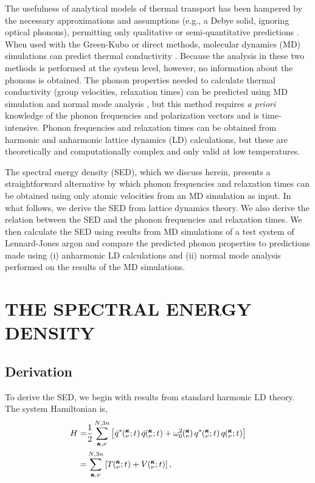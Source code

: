 \documentclass[twocolumn,10pt]{asme2e}
\newcommand{\SUM}[2]{\ifthenelse{\equal{#1}{0}}{\sum_{\alpha_{#2},b_{#2},l_{#2}}^{3,n,N}} {\ifthenelse{\equal{#1}{1}}{\sum_{\alpha_{#2},b_{#2}}^{3,n}}{\sum_{\pmb{\kappa}#2,\nu#2}^{N,3n}}}}
\newcommand{\kvt}{\mspace{-4.0mu}\left(\mspace{-8.0mu}\begin{smallmatrix}&\pmb{\kappa} \\&\nu\end{smallmatrix}\mspace{-2.0mu};t\right)}
\newcommand{\kv}{\mspace{-4.0mu}\left(\mspace{-8.0mu}\begin{smallmatrix}&\pmb{\kappa} \\&\nu\end{smallmatrix}\mspace{-3.0mu}\right)}
\begin{document}
The usefulness of analytical models of thermal transport has been hampered by
the necessary approximations and assumptions (e.g., a Debye solid, ignoring
optical phonons), permitting only qualitative or semi-quantitative
predictions \cite{callaway1959,holland1963}. When used with the Green-Kubo or
direct methods, molecular dynamics (MD) simulations can predict thermal
conductivity \cite{mcgaughey2004c,landry2008,schelling2002,sellan2010a}.
Because the analysis in these two methods is performed at the system level,
however, no information about the phonons is obtained. The phonon properties
needed to calculate thermal conductivity (group velocities, relaxation times)
can be predicted using MD simulation and normal mode analysis
\cite{ladd1986,mcgaughey2004c,henry2008,goicochea2010}, but this method
requires {\em a priori} knowledge of the phonon frequencies and polarization
vectors and is time-intensive. Phonon frequencies and relaxation times can be
obtained from harmonic and anharmonic lattice dynamics (LD)
calculations,\cite{maradudin1962,wallace1972,ladd1986,dove1993,turney2009a}
but these are theoretically and computationally complex and only valid at low
temperatures.

The spectral energy density
(SED)\cite{marayuma2003,shiomi2006,dekoker2009,thomas2010c}, which we discuss
herein, presents a straightforward alternative by which phonon frequencies
and relaxation times can be obtained using only atomic velocities from an MD
simulation as input. In what follows, we derive the SED from lattice dynamics
theory. We also derive the relation between the SED and the phonon
frequencies and relaxation times. We then calculate the SED using results
from MD simulations of a test system of Lennard-Jones argon and compare the
predicted phonon properties to predictions made using (i) anharmonic LD
calculations and (ii) normal mode analysis performed on the results of the MD
simulations.

\section*{THE SPECTRAL ENERGY DENSITY}\label{S:SED}

\subsection*{Derivation}\label{SS:derivation}

To derive the SED, we begin with results from standard harmonic LD theory.
The system Hamiltonian is\cite{turneythesis},
\begin{equation}\label{E:H_HLD}
\begin{split}
H=&\frac{1}{2}\SUM{}{}\left[\dot{q}^*\kvt \dot{q}\kvt + \omega_0^2\kv q^*\kvt q\kvt\right]\\
 =&\SUM{}{}\left[T\kvt + V\kvt\right],
 \end{split}
\end{equation}
\end{document}
